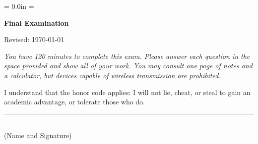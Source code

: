 \documentclass[letterpaper,12pt]{exam}
\def\HeadName{Final Examination}
\begin{document}
\parindent = 0.0in
\parskip = \bigskipamount
\thispagestyle{empty}%
\Head

\centerline{\large \bf \HeadName}%
\centerline{Revised:  \today}

\bigskip
{\it You have 120 minutes to complete this exam.  Please answer each
question in the space provided and show all of your work.
You may consult one page of notes and a calculator,
but devices capable of wireless transmission are prohibited.

I understand that the honor code applies: I will not lie, cheat,
or steal to gain an academic advantage, or tolerate those who do.}

\bigskip
\begin{flushright}
\rule{4in}{0.5pt} \\ (Name and Signature)
\end{flushright}
\end{document}
